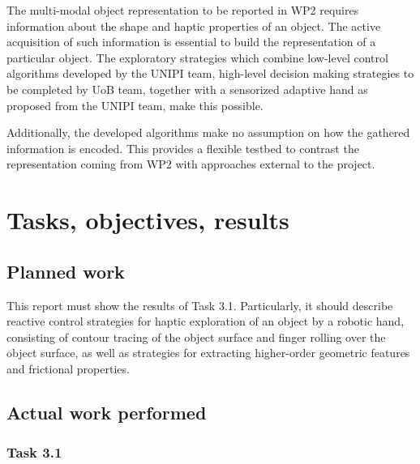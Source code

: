 \documentclass[a4paper,11pt,pdf]{pacmanreport}
\begin{document}
The multi-modal object representation to be reported in WP2 requires information about the shape and haptic properties of an object.
The active acquisition of such information is essential to build the representation of a particular object. The exploratory strategies which combine low-level control algorithms developed by the UNIPI team, high-level decision making strategies to be completed by UoB team, together with a sensorized adaptive hand as proposed from the UNIPI team, make this possible.

Additionally, the developed algorithms make no assumption on how the gathered information is encoded. This provides a flexible testbed to contrast the representation coming from WP2 with approaches external to the project.

\newpage

\section{Tasks, objectives, results}

\subsection{Planned work}

This report must show the results of Task 3.1. Particularly, it should describe reactive control strategies for haptic exploration of an object by a robotic hand, consisting of contour tracing of the object surface and finger rolling over the object surface, as well as strategies for extracting higher-order geometric features and frictional properties. 


\subsection{Actual work performed}

\subsubsection{Task 3.1}
\end{document}
